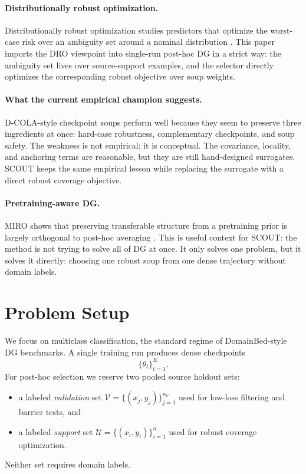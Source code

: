\documentclass{article}
\newcommand{\cU}{\mathcal{U}}
\newcommand{\cV}{\mathcal{V}}
\newcommand{\scout}{\textup{\textsc{SCOUT}}}
\newcommand{\dcola}{\textup{\textsc{D-COLA}}}
\newcommand{\miro}{\textup{\textsc{MIRO}}}
\begin{document}
\paragraph{Distributionally robust optimization.}
Distributionally robust optimization studies predictors that optimize the worst-case risk over an ambiguity set around a nominal distribution \citep{duchi2016fdiv,duchi2021learning}. This paper imports the DRO viewpoint into single-run post-hoc DG in a strict way: the ambiguity set lives over source-support examples, and the selector directly optimizes the corresponding robust objective over soup weights.

\paragraph{What the current empirical champion suggests.}
\dcola{}-style checkpoint soups perform well because they seem to preserve three ingredients at once: hard-case robustness, complementary checkpoints, and soup safety. The weakness is not empirical; it is conceptual. The covariance, locality, and anchoring terms are reasonable, but they are still hand-designed surrogates. \scout{} keeps the same empirical lesson while replacing the surrogate with a direct robust coverage objective.

\paragraph{Pretraining-aware DG.}
\miro{} shows that preserving transferable structure from a pretraining prior is largely orthogonal to post-hoc averaging \citep{cha2022miro}. This is useful context for \scout{}: the method is not trying to solve all of DG at once. It only solves one problem, but it solves it directly: choosing one robust soup from one dense trajectory without domain labels.

\section{Problem Setup}
\label{sec:setup}

We focus on multiclass classification, the standard regime of DomainBed-style DG benchmarks. A single training run produces dense checkpoints
\[
    \{\theta_t\}_{t=1}^{K}.
\]
For post-hoc selection we reserve two pooled source holdout sets:
\begin{itemize}[leftmargin=1.4em]
    \item a labeled \emph{validation} set
    \(
    \cV = \{(x_j,y_j)\}_{j=1}^{n_V}
    \)
    used for low-loss filtering and barrier tests, and
    \item a labeled \emph{support} set
    \(
    \cU = \{(x_i,y_i)\}_{i=1}^{n}
    \)
    used for robust coverage optimization.
\end{itemize}
Neither set requires domain labels.
\end{document}
